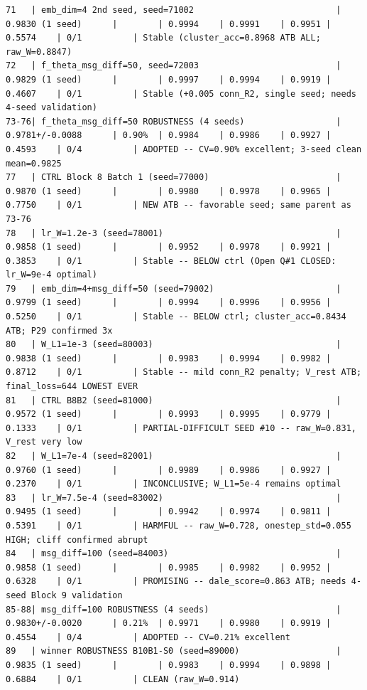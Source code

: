 \documentclass{article}
\begin{document}
\begin{tiny}
\begin{verbatim}
71   | emb_dim=4 2nd seed, seed=71002                            | 0.9830 (1 seed)      |        | 0.9994    | 0.9991    | 0.9951 | 0.5574    | 0/1          | Stable (cluster_acc=0.8968 ATB ALL; raw_W=0.8847)
72   | f_theta_msg_diff=50, seed=72003                           | 0.9829 (1 seed)      |        | 0.9997    | 0.9994    | 0.9919 | 0.4607    | 0/1          | Stable (+0.005 conn_R2, single seed; needs 4-seed validation)
73-76| f_theta_msg_diff=50 ROBUSTNESS (4 seeds)                  | 0.9781+/-0.0088      | 0.90%  | 0.9984    | 0.9986    | 0.9927 | 0.4593    | 0/4          | ADOPTED -- CV=0.90% excellent; 3-seed clean mean=0.9825
77   | CTRL Block 8 Batch 1 (seed=77000)                         | 0.9870 (1 seed)      |        | 0.9980    | 0.9978    | 0.9965 | 0.7750    | 0/1          | NEW ATB -- favorable seed; same parent as 73-76
78   | lr_W=1.2e-3 (seed=78001)                                  | 0.9858 (1 seed)      |        | 0.9952    | 0.9978    | 0.9921 | 0.3853    | 0/1          | Stable -- BELOW ctrl (Open Q#1 CLOSED: lr_W=9e-4 optimal)
79   | emb_dim=4+msg_diff=50 (seed=79002)                        | 0.9799 (1 seed)      |        | 0.9994    | 0.9996    | 0.9956 | 0.5250    | 0/1          | Stable -- BELOW ctrl; cluster_acc=0.8434 ATB; P29 confirmed 3x
80   | W_L1=1e-3 (seed=80003)                                    | 0.9838 (1 seed)      |        | 0.9983    | 0.9994    | 0.9982 | 0.8712    | 0/1          | Stable -- mild conn_R2 penalty; V_rest ATB; final_loss=644 LOWEST EVER
81   | CTRL B8B2 (seed=81000)                                    | 0.9572 (1 seed)      |        | 0.9993    | 0.9995    | 0.9779 | 0.1333    | 0/1          | PARTIAL-DIFFICULT SEED #10 -- raw_W=0.831, V_rest very low
82   | W_L1=7e-4 (seed=82001)                                    | 0.9760 (1 seed)      |        | 0.9989    | 0.9986    | 0.9927 | 0.2370    | 0/1          | INCONCLUSIVE; W_L1=5e-4 remains optimal
83   | lr_W=7.5e-4 (seed=83002)                                  | 0.9495 (1 seed)      |        | 0.9942    | 0.9974    | 0.9811 | 0.5391    | 0/1          | HARMFUL -- raw_W=0.728, onestep_std=0.055 HIGH; cliff confirmed abrupt
84   | msg_diff=100 (seed=84003)                                 | 0.9858 (1 seed)      |        | 0.9985    | 0.9982    | 0.9952 | 0.6328    | 0/1          | PROMISING -- dale_score=0.863 ATB; needs 4-seed Block 9 validation
85-88| msg_diff=100 ROBUSTNESS (4 seeds)                         | 0.9830+/-0.0020      | 0.21%  | 0.9971    | 0.9980    | 0.9919 | 0.4554    | 0/4          | ADOPTED -- CV=0.21% excellent
89   | winner ROBUSTNESS B10B1-S0 (seed=89000)                   | 0.9835 (1 seed)      |        | 0.9983    | 0.9994    | 0.9898 | 0.6884    | 0/1          | CLEAN (raw_W=0.914)

\end{verbatim}
\end{tiny}
\end{document}
